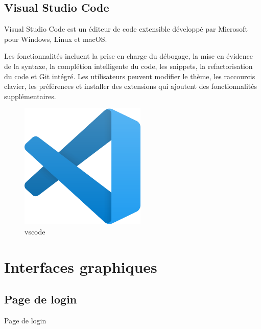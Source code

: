 \subsection{Visual Studio Code}

Visual Studio Code est un éditeur de code extensible développé par Microsoft pour Windows, Linux et macOS.

Les fonctionnalités incluent la prise en charge du débogage, la mise en évidence de la syntaxe, la complétion intelligente du code, les snippets, la refactorisation du code et Git intégré. Les utilisateurs peuvent modifier le thème, les raccourcis clavier, les préférences et installer des extensions qui ajoutent des fonctionnalités supplémentaires.

\begin{figure}[!h]
\begin{center}
\includegraphics[height=6cm]{vscode.svg.png}
\end{center}
\caption{vscode}
\end{figure}


\section{Interfaces graphiques}

\subsection{Page de login}

Page de login 


